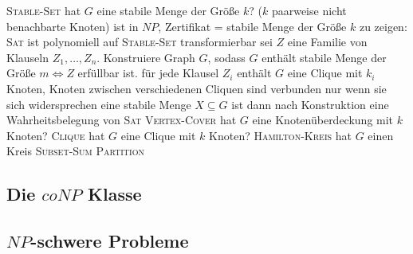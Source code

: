 \begin{outline}
    \1 \textsc{Stable-Set}
        \2 hat $G$ eine stabile Menge der Größe $k$? ($k$ paarweise nicht benachbarte Knoten)
        \2 ist in $NP$, Zertifikat = stabile Menge der Größe $k$
        \2 zu zeigen: \textsc{Sat} ist polynomiell auf \textsc{Stable-Set} transformierbar
            \3 sei $Z$ eine Familie von Klauseln $Z_1,\ldots, Z_n$. Konstruiere Graph $G$, sodass $G$ enthält stabile Menge der Größe $m \iff Z$ erfüllbar ist.
            \3 für jede Klausel $Z_i$ enthält $G$ eine Clique mit $k_i$ Knoten, Knoten zwischen verschiedenen Cliquen sind verbunden nur wenn sie sich widersprechen
            \3 eine stabile Menge $X\subseteq G$ ist dann nach Konstruktion eine Wahrheitsbelegung von \textsc{Sat}
    \1 \textsc{Vertex-Cover}
        \2 hat $G$ eine Knotenüberdeckung mit $k$ Knoten?
    \1 \textsc{Clique}
        \2 hat $G$ eine Clique mit $k$ Knoten?
    \1 \textsc{Hamilton-Kreis}
        \2 hat $G$ einen Kreis
    \1 \textsc{Subset-Sum}
    \1 \textsc{Partition}
\end{outline}

\subsection{Die $coNP$ Klasse}

\subsection{$NP$-schwere Probleme}
